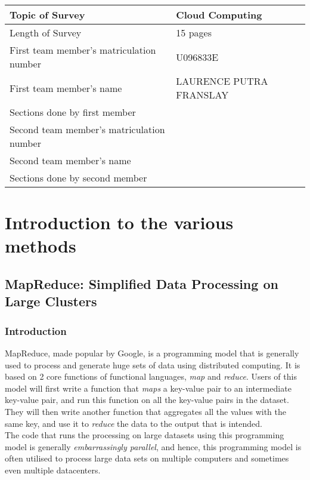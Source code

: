 \documentclass[]{article}
\begin{document}
\begin{table}[here]
\centering
\begin{tabularx}{\textwidth}{| X | X | }
\hline
Topic of Survey						& 	Cloud Computing\\
\hline
Length of Survey						& 	15 pages\\
\hline
First team member's matriculation number	&	U096833E\\
\hline
First team member's name				&	LAURENCE PUTRA FRANSLAY\\
\hline
Sections done by first member				& 	\\
\hline
Second team member's matriculation number	&	\\
\hline
Second team member's name				&	\\
\hline
Sections done by second member			& 	\\
\hline

\hline
\end{tabularx}
\end{table}

\pagebreak

\section{Introduction to the various methods}
\subsection{MapReduce: Simplified Data Processing on Large Clusters}
\subsubsection{Introduction}
MapReduce, made popular by Google, is a programming model that is generally used to process and generate huge sets of data using distributed computing. It is based on 2 core functions of functional languages, \emph{map} and \emph{reduce}. Users of this model will first write a function that \emph{maps} a key-value pair to an intermediate key-value pair, and run this function on all the key-value pairs in the dataset. They will then write another function that aggregates all the values with the same key, and use it to \emph{reduce} the data to the output that is intended. \\

The code that runs the processing on large datasets using this programming model is generally \emph{embarrassingly parallel}\footnotemark{}, and hence, this programming model is often utilised to process large data sets on multiple computers and sometimes even multiple datacenters. \\
\end{document}
